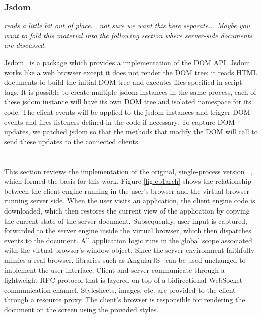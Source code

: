 \subsubsection{Jsdom}

\emph{reads a little bit out of place... not sure we want this here separate...
%
    Maybe you want to fold this material into the following section where 
    server-side documents are discussed.
}

Jsdom~\cite{JSDOM} is a \nodejs package which provides a \js implementation of the
DOM API. %
Jsdom works like a web browser except it does not render the DOM tree:
it reads HTML documents to build the initial DOM tree and executes \js files specified in script tags.
It is possible to create multiple jsdom instances in the same process,
each of these jsdom instance will have its own DOM tree and
isolated namespace for its \js code.
The client events will be applied to the jsdom instances and
trigger DOM events and fires listeners defined in the \js code if necessary.
To capture DOM updates, we patched jsdom so that the methods that modify the DOM
will call \cb{} to send these updates to the connected clients.

\section{\cb}

\architectureoverview{}

This section reviews the implementation of
the original, single-process version \cb{}~\cite{mcdaniel2012cloudbrowser},
which formed the basis for this work.
Figure \ref{fig:cb1arch} shows the relationship
between the client engine running in the user's browser and the virtual browser
running server side.  When the user visits an application, the client engine
code is downloaded, which then restores the current view of the application by
copying the current state of the server document.  Subsequently, user input
is captured, forwarded to the server engine inside the virtual browser,
which then dispatches events to the document.  All application logic runs
in the global scope associated with the virtual browser's window object.
Since the server environment faithfully mimics a real browser, libraries
such as AngularJS~\cite{hevery2009angular} can be used unchanged to implement 
the user interface.
Client and server communicate through a lightweight RPC protocol that is
layered on top of a bidirectional WebSocket communication channel.
Stylesheets, images, etc. are provided to the client through a resource
proxy.  The client's browser is responsible for rendering the document
on the screen using the provided styles.

